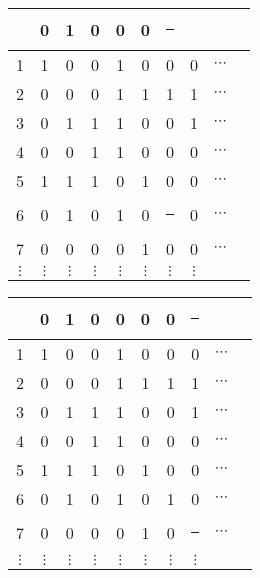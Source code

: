 \documentclass[compress,17pt]{beamer}
\newcommand\hl{\bgroup\markoverwith
    {\textcolor{yellow}{\rule[-.5ex]{.1pt}{2.5ex}}}\ULon}
\begin{document}
\begin{frame}
  \begin{tabular}{ | c | c c c c c c c c c }
    \hline
    &  0 & 1 & 0 & 0 & 0 & \hl 0\\
    \hline

    1 & 1 & 0 & 0 & 1 & 0 & 0 & 0 & $\cdots$\\
    2 & 0 & 0 & 0 & 1 & 1 & 1 & 1 & $\cdots$\\
    3 & 0 & 1 & 1 & 1 & 0 & 0 & 1 & $\cdots$\\
    4 & 0 & 0 & 1 & 1 & 0 & 0 & 0 & $\cdots$\\
    5 & 1 & 1 & 1 & 0 & 1 & 0 & 0 & $\cdots$\\
    6 & 0 & 1 & 0 & 1 & 0 & \hl 1 & 0 & $\cdots$\\
    7 & 0 & 0 & 0 & 0 & 1 & 0 & 0 & $\cdots$\\
    $\vdots$ & $\vdots$ & $\vdots$ & $\vdots$ & $\vdots$ & $\vdots$ & $\vdots$ & $\vdots$ & \\
  \end{tabular}
\end{frame}

\begin{frame}
  \begin{tabular}{ | c | c c c c c c c c c }
    \hline
    & 0 & 1 & 0 & 0 & 0 & 0 & \hl 1 \\
    \hline

    1 & 1 & 0 & 0 & 1 & 0 & 0 & 0 & $\cdots$\\
    2 & 0 & 0 & 0 & 1 & 1 & 1 & 1 & $\cdots$\\
    3 & 0 & 1 & 1 & 1 & 0 & 0 & 1 & $\cdots$\\
    4 & 0 & 0 & 1 & 1 & 0 & 0 & 0 & $\cdots$\\
    5 & 1 & 1 & 1 & 0 & 1 & 0 & 0 & $\cdots$\\
    6 & 0 & 1 & 0 & 1 & 0 & 1 & 0 & $\cdots$\\
    7 & 0 & 0 & 0 & 0 & 1 & 0 & \hl 0 & $\cdots$\\
    $\vdots$ & $\vdots$ & $\vdots$ & $\vdots$ & $\vdots$ & $\vdots$ & $\vdots$ & $\vdots$ & \\
  \end{tabular}
\end{frame}
\end{document}
